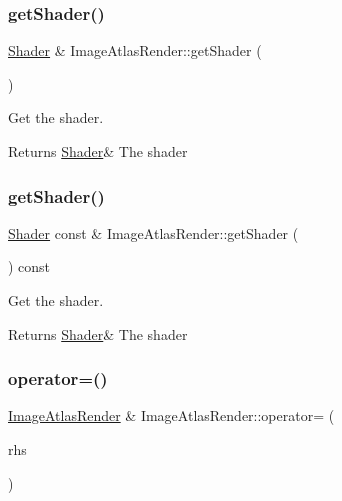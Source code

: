 \subsubsection{\texorpdfstring{get\+Shader()}{getShader()}\hspace{0.1cm}{\footnotesize\ttfamily [1/2]}}
{\footnotesize\ttfamily \hyperlink{class_shader}{Shader} \& Image\+Atlas\+Render\+::get\+Shader (\begin{DoxyParamCaption}{ }\end{DoxyParamCaption})}



Get the shader. 

\begin{DoxyReturn}{Returns}
\hyperlink{class_shader}{Shader}\& The shader 
\end{DoxyReturn}
\mbox{\label{class_image_atlas_render_a4c72d64708b498abcddfb27c9851503c}} 
\subsubsection{\texorpdfstring{get\+Shader()}{getShader()}\hspace{0.1cm}{\footnotesize\ttfamily [2/2]}}
{\footnotesize\ttfamily \hyperlink{class_shader}{Shader} const  \& Image\+Atlas\+Render\+::get\+Shader (\begin{DoxyParamCaption}{ }\end{DoxyParamCaption}) const}



Get the shader. 

\begin{DoxyReturn}{Returns}
\hyperlink{class_shader}{Shader}\& The shader 
\end{DoxyReturn}
\mbox{\label{class_image_atlas_render_a069c9bdf26534ddc159545eb27186745}} 
\subsubsection{\texorpdfstring{operator=()}{operator=()}}
{\footnotesize\ttfamily \hyperlink{class_image_atlas_render}{Image\+Atlas\+Render} \& Image\+Atlas\+Render\+::operator= (\begin{DoxyParamCaption}\item[{\hyperlink{class_image_atlas_render}{Image\+Atlas\+Render} const \&}]{rhs }\end{DoxyParamCaption})}



